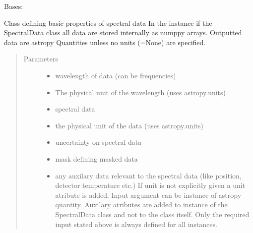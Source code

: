\documentclass[a4paper,10pt,english]{sphinxmanual}
\begin{document}
\begin{fulllineitems}
\label{\detokenize{cascade.data_model:cascade.data_model.data_model.SpectralData}}
Bases: {\hyperref[\detokenize{cascade.data_model:cascade.data_model.data_model.InstanceDescriptorMixin}]{}}

Class defining basic properties of spectral data
In the instance if the SpectralData class
all data are stored internally as numppy arrays. Outputted data are
astropy Quantities unless no units (=None) are specified.
\begin{quote}\begin{description}
\item[{Parameters}] \leavevmode\begin{itemize}
\item {} 
 \textendash{} wavelength of data (can be frequencies)

\item {} 
 \textendash{} The physical unit of the wavelength (uses astropy.units)

\item {} 
 \textendash{} spectral data

\item {} 
 \textendash{} the physical unit of the data (uses astropy.units)

\item {} 
 \textendash{} uncertainty on spectral data

\item {} 
 \textendash{} mask defining masked data

\item {} 
 \textendash{} any auxilary data relevant to the spectral data
(like position, detector temperature etc.)
If unit is not explicitly given a unit atribute is added.
Input argument can be instance of astropy quantity.
Auxilary atributes are added to instance of the SpectralData class
and not to the class itself. Only the required input stated above
is always defined for all instances.


\end{itemize}
\end{description}
\end{quote}
\end{fulllineitems}
\end{document}
